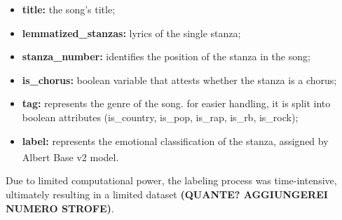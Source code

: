 \begin{itemize}
    \item \textbf{title:} the song's title;

    \item \textbf{lemmatized\_stanzas:} lyrics of the single stanza;
    
    \item \textbf{stanza\_number:} identifies the position of the stanza in the song;

    \item \textbf{is\_chorus:} boolean variable that attests whether the stanza is
        a chorus;
    
    \item \textbf{tag:} represents the genre of the song. for easier handling,
        it is split into boolean attributes
        (is\_country, is\_pop, is\_rap, is\_rb, is\_rock);

    \item \textbf{label:} represents the emotional classification of the stanza,
        assigned by Albert Base v2\textsuperscript{\cite{albert-base-v2}} model.
    
\end{itemize}

Due to limited computational power, the labeling process was time-intensive,
ultimately resulting in a limited dataset \textbf{(QUANTE? AGGIUNGEREI NUMERO STROFE)}.\\
